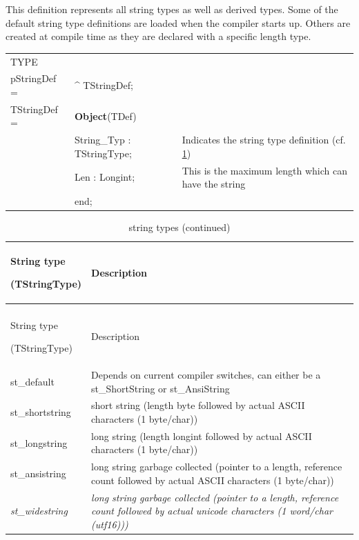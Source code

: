 \documentclass [a4paper,12pt]{article}
\begin{document}
This definition represents all string types as well as derived types. Some
of the default string type definitions are loaded when the compiler starts
up. Others are created at compile time as they are declared with a specific
length type.

\begin{tabular*}{6.5in}{|l@{\extracolsep{\fill}}lp{8cm}|}
\hline
\textsf{TYPE}& & \\
\xspace pStringDef = & \^{}  TStringDef; & \\
\xspace \textsf{TStringDef} = & \textbf{Object}(TDef) & \\
&\textsf{String{\_}Typ : TStringType;}&
    Indicates the string type definition (cf. \ref{tstringtype}) \\
&\textsf{Len : Longint;}&
    This is the maximum length which can have the string \\
&\textsf{end;}& \\
\hline
\end{tabular*}

\begin{longtable}{|l|p{10cm}|}
\caption{string types}\label{tstringtype}\\
\hline
String type \par (TStringType) & Description \\
\hline
\endfirsthead
\caption{string types (continued)}\\
\hline
String type \par (TStringType) & Description \\
\hline
\endhead
\hline
\endfoot
\textsf{st{\_}default}&
    Depends on current compiler switches, can either be a
    st{\_}ShortString or st{\_}AnsiString \\
\textsf{st{\_}shortstring}&
    short string (length byte followed by actual ASCII characters (1
    byte/char)) \\
\textsf{st{\_}longstring}&
    long string (length longint followed by actual ASCII characters (1
    byte/char)) \\
\textsf{st{\_}ansistring}&
    long string garbage collected (pointer to a length, reference count
    followed by actual ASCII characters (1 byte/char)) \\
\textsf{\textit{st{\_}widestring}}&
    \textit{long string garbage collected (pointer to a length,
    reference count followed by actual unicode characters (1
    word/char (utf16)))} \\
\end{longtable}
\end{document}
